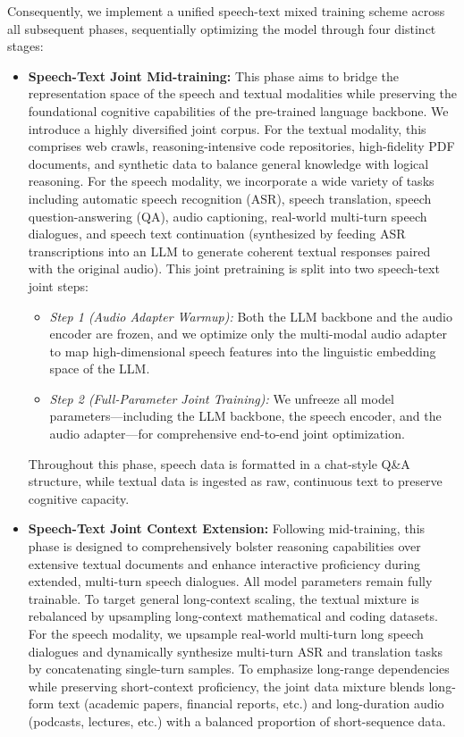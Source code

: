 Consequently, we implement a unified speech-text mixed training scheme across all subsequent phases, sequentially optimizing the model through four distinct stages:

\begin{itemize}
    \item \textbf{Speech-Text Joint Mid-training:} This phase aims to bridge the representation space of the speech and textual modalities while preserving the foundational cognitive capabilities of the pre-trained language backbone. We introduce a highly diversified joint corpus. For the textual modality, this comprises web crawls, reasoning-intensive code repositories, high-fidelity PDF documents, and synthetic data to balance general knowledge with logical reasoning. For the speech modality, we incorporate a wide variety of tasks including automatic speech recognition (ASR), speech translation, speech question-answering (QA), audio captioning, real-world multi-turn speech dialogues, and speech text continuation (synthesized by feeding ASR transcriptions into an LLM to generate coherent textual responses paired with the original audio). This joint pretraining is split into two speech-text joint steps: 
    \begin{itemize}
        \item \textit{Step 1 (Audio Adapter Warmup):} Both the LLM backbone and the audio encoder are frozen, and we optimize only the multi-modal audio adapter to map high-dimensional speech features into the linguistic embedding space of the LLM.
        \item \textit{Step 2 (Full-Parameter Joint Training):} We unfreeze all model parameters—including the LLM backbone, the speech encoder, and the audio adapter—for comprehensive end-to-end joint optimization.
    \end{itemize}
    Throughout this phase, speech data is formatted in a chat-style Q\&A structure, while textual data is ingested as raw, continuous text to preserve cognitive capacity.
    
    \item \textbf{Speech-Text Joint Context Extension:} Following mid-training, this phase is designed to comprehensively bolster reasoning capabilities over extensive textual documents and enhance interactive proficiency during extended, multi-turn speech dialogues. All model parameters remain fully trainable. To target general long-context scaling, the textual mixture is rebalanced by upsampling long-context mathematical and coding datasets. For the speech modality, we upsample real-world multi-turn long speech dialogues and dynamically synthesize multi-turn ASR and translation tasks by concatenating single-turn samples. To emphasize long-range dependencies while preserving short-context proficiency, the joint data mixture blends long-form text (academic papers, financial reports, etc.) and long-duration audio (podcasts, lectures, etc.) with a balanced proportion of short-sequence data.
    

\end{itemize}
